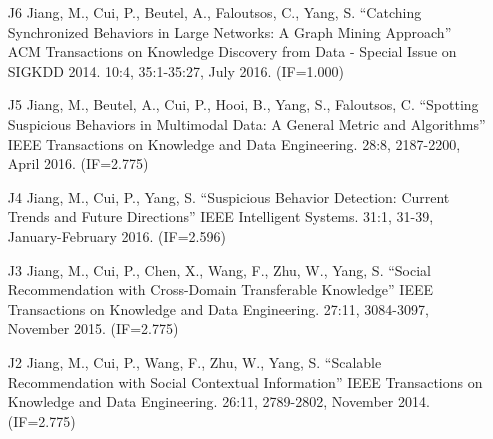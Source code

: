 \documentclass[10pt]{article}
\newenvironment{myindentpar}[1]%
{\begin{list}{}%
         {\setlength{\leftmargin}{#1}}%
         \item[]%
}
{\end{list}}
\newcounter{list}
\begin{document}
\begin{myindentpar}{0.00cm}
\begin{enumerate}[leftmargin=.5cm]
\item[J6] Jiang, M., Cui, P., Beutel, A., Faloutsos, C., Yang, S. ``Catching Synchronized Behaviors in Large Networks: A Graph Mining Approach'' ACM Transactions on Knowledge Discovery from Data - Special Issue on SIGKDD 2014. 10:4, 35:1-35:27, July 2016. (IF=1.000)

\vspace{-0.1cm}

\item[J5] Jiang, M., Beutel, A., Cui, P., Hooi, B., Yang, S., Faloutsos, C. ``Spotting Suspicious Behaviors in Multimodal Data: A General Metric and Algorithms'' IEEE Transactions on Knowledge and Data Engineering. 28:8, 2187-2200, April 2016. (IF=2.775)

\vspace{-0.1cm}

\item[J4] Jiang, M., Cui, P., Yang, S. ``Suspicious Behavior Detection: Current Trends and Future Directions'' IEEE Intelligent Systems. 31:1, 31-39, January-February 2016. (IF=2.596)

\vspace{-0.1cm}

\item[J3] Jiang, M., Cui, P., Chen, X., Wang, F., Zhu, W., Yang, S. ``Social Recommendation with Cross-Domain Transferable Knowledge'' IEEE Transactions on Knowledge and Data Engineering. 27:11, 3084-3097, November 2015. (IF=2.775)

\vspace{-0.1cm}
\vspace{0.15cm}

\item[J2] Jiang, M., Cui, P., Wang, F., Zhu, W., Yang, S. ``Scalable Recommendation with Social Contextual Information'' IEEE Transactions on Knowledge and Data Engineering. 26:11, 2789-2802, November 2014. (IF=2.775)


\end{enumerate}
\end{myindentpar}
\end{document}
